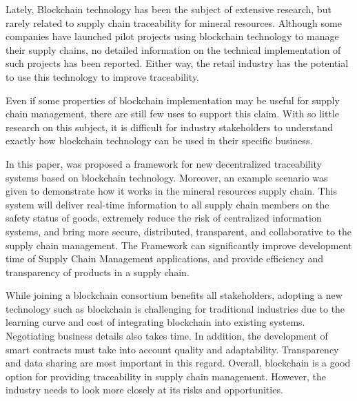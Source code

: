 \acresetall 

Lately, Blockchain technology has been the subject of extensive research, but rarely related to supply chain traceability for mineral resources. Although some companies have launched pilot projects using blockchain technology to manage their supply chains, no detailed information on the technical implementation of such projects has been reported. Either way, the retail industry has the potential to use this technology to improve traceability.

Even if some properties of blockchain implementation may be useful for supply chain management, there are still few uses to support this claim. With so little research on this subject, it is difficult for industry stakeholders to understand exactly how blockchain technology can be used in their specific business.

In this paper, was proposed a framework for new decentralized traceability systems based on blockchain technology. Moreover, an example scenario was given to demonstrate how it works in the mineral resources supply chain. This system will deliver real-time information to all supply chain members on the safety status of goods, extremely reduce the risk of centralized information systems, and bring more secure, distributed, transparent, and collaborative to the supply chain management. The Framework can significantly improve development time of Supply Chain Management applications, and provide efficiency and transparency of products in a supply chain.

While joining a blockchain consortium benefits all stakeholders, adopting a new technology such as blockchain is challenging for traditional industries due to the learning curve and cost of integrating blockchain into existing systems. Negotiating business details also takes time. In addition, the development of smart contracts must take into account quality and adaptability. Transparency and data sharing are most important in this regard. Overall, blockchain is a good option for providing traceability in supply chain management. However, the industry needs to look more closely at its risks and opportunities.